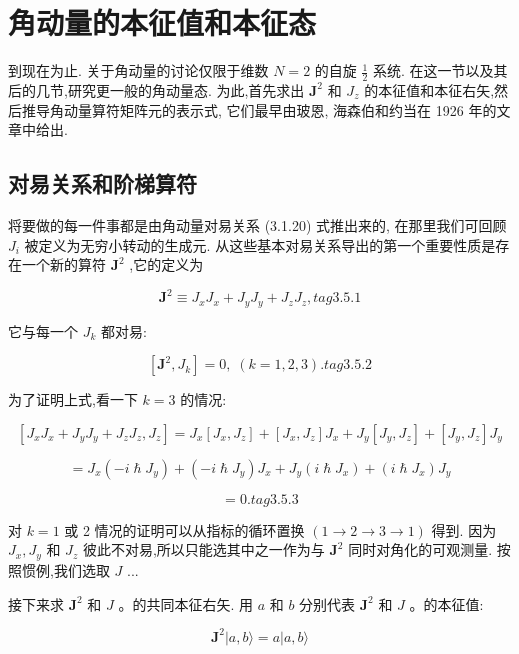 \section{角动量的本征值和本征态}

到现在为止. 关于角动量的讨论仅限于维数 $N = 2$ 的自旋 $\frac{1}{2}$ 系统. 在这一节以及其后的几节,研究更一般的角动量态. 为此,首先求出 ${\mathbf{J}}^{2}$ 和 ${J}_{z}$ 的本征值和本征右矢,然后推导角动量算符矩阵元的表示式, 它们最早由玻恩, 海森伯和约当在 1926 年的文章中给出.

\subsection{对易关系和阶梯算符}

将要做的每一件事都是由角动量对易关系 (3.1.20) 式推出来的, 在那里我们可回顾 ${J}_{i}$ 被定义为无穷小转动的生成元. 从这些基本对易关系导出的第一个重要性质是存在一个新的算符 ${\mathbf{J}}^{2}$ ,它的定义为

$$
{\mathbf{J}}^{2} \equiv {J}_{x}{J}_{x} + {J}_{y}{J}_{y} + {J}_{z}{J}_{z}, tag{3.5.1}
$$

它与每一个 ${J}_{k}$ 都对易:

$$
\left\lbrack {{\mathbf{J}}^{2},{J}_{k}}\right\rbrack = 0,\;\left( {k = 1,2,3}\right) . tag{3.5.2}
$$

为了证明上式,看一下 $k = 3$ 的情况:

$$
\left\lbrack {{J}_{x}{J}_{x} + {J}_{y}{J}_{y} + {J}_{z}{J}_{z},{J}_{z}}\right\rbrack = {J}_{x}\left\lbrack {{J}_{x},{J}_{z}}\right\rbrack + \left\lbrack {{J}_{x},{J}_{z}}\right\rbrack {J}_{x} + {J}_{y}\left\lbrack {{J}_{y},{J}_{z}}\right\rbrack + \left\lbrack {{J}_{y},{J}_{z}}\right\rbrack {J}_{y}
$$

$$
= {J}_{x}\left( {-i\hslash {J}_{y}}\right) + \left( {-i\hslash {J}_{y}}\right) {J}_{x} + {J}_{y}\left( {i\hslash {J}_{x}}\right) + \left( {i\hslash {J}_{x}}\right) {J}_{y}
$$

$$
= 0\text{.} tag{3.5.3}
$$

对 $k = 1$ 或 2 情况的证明可以从指标的循环置换 $\left( {1 \rightarrow 2 \rightarrow 3 \rightarrow 1}\right)$ 得到. 因为 ${J}_{x},{J}_{y}$ 和 ${J}_{z}$ 彼此不对易,所以只能选其中之一作为与 ${\mathbf{J}}^{2}$ 同时对角化的可观测量. 按照惯例,我们选取 $J$ ...

接下来求 ${\mathbf{J}}^{2}$ 和 $J$ 。的共同本征右矢. 用 $a$ 和 $b$ 分别代表 ${\mathbf{J}}^{2}$ 和 $J$ 。的本征值:

$$
{\mathbf{J}}^{2}\left| {a, b\rangle = a}\right| a, b\rangle
$$

